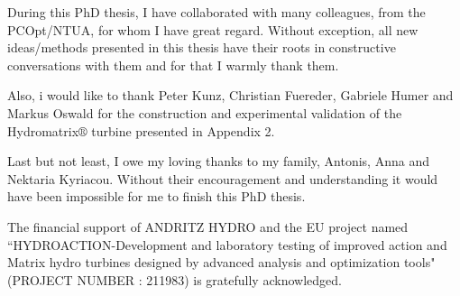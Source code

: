 \begin{acknowledgements}
During this PhD thesis, I have collaborated with many colleagues, from the PCOpt/NTUA, for whom I have great regard. Without exception, all new ideas/methods presented in this thesis have their roots in constructive conversations with them and for that I warmly thank them.   

Also, i would like to thank Peter Kunz, Christian Fuereder, Gabriele Humer and Markus Oswald for the construction and experimental validation of the Hydromatrix$\circledR$ turbine presented in Appendix 2.

Last but not least, I owe my loving thanks to my family, Antonis, Anna and Nektaria Kyriacou.  Without their encouragement and understanding it would have been impossible for me to finish this PhD thesis. 

The financial support of ANDRITZ HYDRO and the EU project named ``HYDROACTION-Development and laboratory testing of improved action and Matrix hydro turbines designed by advanced analysis and optimization tools" (PROJECT NUMBER : 211983) is gratefully acknowledged.

\end{acknowledgements}



